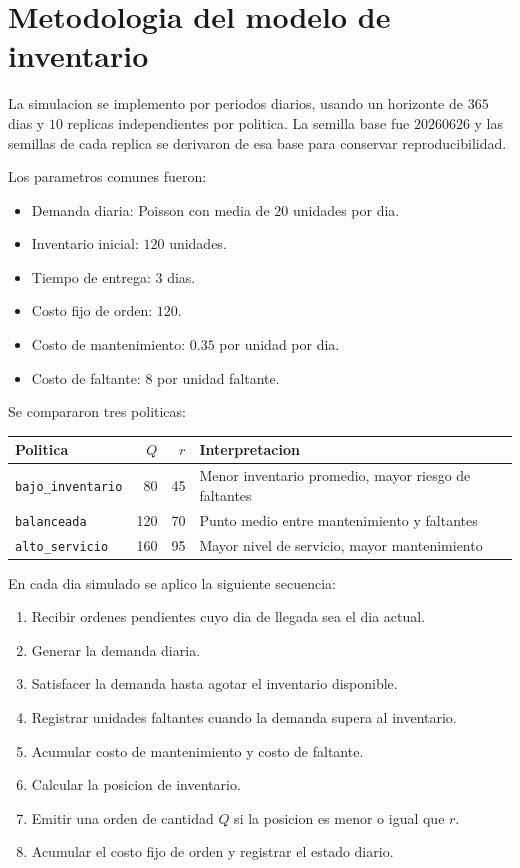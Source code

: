 \section{Metodologia del modelo de inventario}

La simulacion se implemento por periodos diarios, usando un horizonte de $365$ dias y $10$ replicas independientes por politica. La semilla base fue $20260626$ y las semillas de cada replica se derivaron de esa base para conservar reproducibilidad.

Los parametros comunes fueron:

\begin{itemize}
    \item Demanda diaria: Poisson con media de $20$ unidades por dia.
    \item Inventario inicial: $120$ unidades.
    \item Tiempo de entrega: $3$ dias.
    \item Costo fijo de orden: $120$.
    \item Costo de mantenimiento: $0.35$ por unidad por dia.
    \item Costo de faltante: $8$ por unidad faltante.
\end{itemize}

Se compararon tres politicas:

\begin{center}
\begin{tabular}{lrrl}
\toprule
Politica & $Q$ & $r$ & Interpretacion \\
\midrule
\texttt{bajo\_inventario} & 80 & 45 & Menor inventario promedio, mayor riesgo de faltantes \\
\texttt{balanceada} & 120 & 70 & Punto medio entre mantenimiento y faltantes \\
\texttt{alto\_servicio} & 160 & 95 & Mayor nivel de servicio, mayor mantenimiento \\
\bottomrule
\end{tabular}
\end{center}

En cada dia simulado se aplico la siguiente secuencia:

\begin{enumerate}
    \item Recibir ordenes pendientes cuyo dia de llegada sea el dia actual.
    \item Generar la demanda diaria.
    \item Satisfacer la demanda hasta agotar el inventario disponible.
    \item Registrar unidades faltantes cuando la demanda supera al inventario.
    \item Acumular costo de mantenimiento y costo de faltante.
    \item Calcular la posicion de inventario.
    \item Emitir una orden de cantidad $Q$ si la posicion es menor o igual que $r$.
    \item Acumular el costo fijo de orden y registrar el estado diario.
\end{enumerate}


